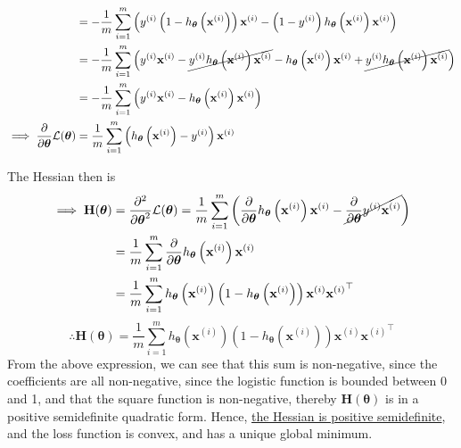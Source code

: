 \begin{align*}
     & =
    -\frac{1}{m} \sum_{i=1}^{m}
    \left(
    y^{(i)} \left(1-h_{\boldsymbol{\theta}}\left(\mathbf{x}^{(i)}\right)\right) \mathbf{x}^{(i)}
    -
    \left(1-y^{(i)}\right) h_{\boldsymbol{\theta}}\left(\mathbf{x}^{(i)}\right) \mathbf{x}^{(i)}
    \right)
    \\ & =
    -\frac{1}{m} \sum_{i=1}^{m}
    \Big(
    y^{(i)} \mathbf{x}^{(i)}
    -
    \cancel{y^{(i)} h_{\boldsymbol{\theta}}\left(\mathbf{x}^{(i)}\right) \mathbf{x}^{(i)}}
    -
    h_{\boldsymbol{\theta}}\left(\mathbf{x}^{(i)}\right) \mathbf{x}^{(i)}
    +
    \cancel{y^{(i)} h_{\boldsymbol{\theta}}\left(\mathbf{x}^{(i)}\right) \mathbf{x}^{(i)}}
    \Big)
    \\ & =
    -\frac{1}{m} \sum_{i=1}^{m}
    \left(
    y^{(i)} \mathbf{x}^{(i)}
    -
    h_{\boldsymbol{\theta}}\left(\mathbf{x}^{(i)}\right) \mathbf{x}^{(i)}
    \right)
    \\
    \implies
    \frac{\partial}{\partial \boldsymbol{\theta}} \mathcal{L}(\boldsymbol{\theta})
     & =
    \frac{1}{m} \sum_{i=1}^{m}
    \left(
    h_{\boldsymbol{\theta}}\left(\mathbf{x}^{(i)}\right)
    -
    y^{(i)}
    \right)
    \mathbf{x}^{(i)}
\end{align*}

The Hessian then is
\begin{align*}
    \implies
    \mathbf{H}(\boldsymbol{\theta})
     & =
    \frac{\partial^2}{\partial \boldsymbol{\theta}^2} \mathcal{L}(\boldsymbol{\theta})
    =
    \frac{1}{m} \sum_{i=1}^{m}
    \left(
    \frac{\partial}{\partial \boldsymbol{\theta}} h_{\boldsymbol{\theta}}\left(\mathbf{x}^{(i)}\right) \mathbf{x}^{(i)}
    -
    \cancel{\frac{\partial}{\partial \boldsymbol{\theta}} y^{(i)} \mathbf{x}^{(i)}}
    \right)
    \\ & =
    \frac{1}{m} \sum_{i=1}^{m}
    \frac{\partial}{\partial \boldsymbol{\theta}} h_{\boldsymbol{\theta}}\left(\mathbf{x}^{(i)}\right) \mathbf{x}^{(i)}
    \\ & =
    \frac{1}{m} \sum_{i=1}^{m}
    h_{\boldsymbol{\theta}}\left(\mathbf{x}^{(i)}\right) \left(1-h_{\boldsymbol{\theta}}\left(\mathbf{x}^{(i)}\right)\right) \mathbf{x}^{(i)} {\mathbf{x}^{(i)}}^\top
\end{align*}
\begin{equation*}
    \therefore
    \boxed{
    \mathbf{H}(\boldsymbol{\theta})
    =
    \frac{1}{m} \sum_{i=1}^{m}
    h_{\boldsymbol{\theta}}\left(\mathbf{x}^{(i)}\right) \left(1-h_{\boldsymbol{\theta}}\left(\mathbf{x}^{(i)}\right)\right)
    \mathbf{x}^{(i)} {\mathbf{x}^{(i)}}^\top
    }
\end{equation*}
From the above expression, we can see that this sum is non-negative, since the coefficients are all non-negative, since the logistic function is bounded between 0 and 1, and that the square function is non-negative, thereby \( \mathbf{H}(\boldsymbol{\theta}) \) is in a positive semidefinite quadratic form.
Hence, \underline{the Hessian is positive semidefinite}, and the loss function is convex, and has a unique global minimum.

